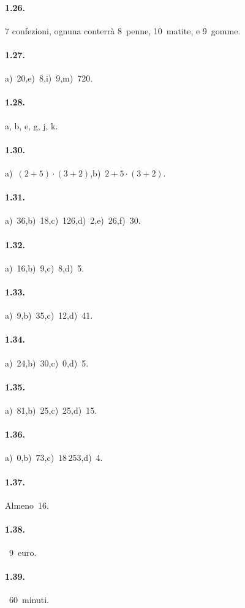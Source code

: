 \paragraph{1.26.}
7 confezioni, ognuna conterrà 8~penne, 10~matite, e 9~gomme.

\paragraph{1.27.}
a)~20,\quad e)~8,\quad i)~9,\quad m)~720.

\paragraph{1.28.}
a, b, e, g, j, k.

\paragraph{1.30.}
a)~$ (2+5)\cdot(3+2) $,\quad b)~$ 2+5\cdot(3+2) $.

\paragraph{1.31.}
a)~36,\quad b)~18,\quad c)~126,\quad d)~2,\quad e)~26,\quad f)~30.

\paragraph{1.32.}
a)~16,\quad b)~9,\quad c)~8,\quad d)~5.

\paragraph{1.33.}
a)~9,\quad b)~35,\quad c)~12,\quad d)~41.

\paragraph{1.34.}
a)~24,\quad b)~30,\quad c)~0,\quad d)~5.

\paragraph{1.35.}
a)~81,\quad b)~25,\quad c)~25,\quad d)~15.

\paragraph{1.36.}
a)~0,\quad b)~73,\quad c)~$18\,253$,\quad d)~4.
\begin{multicols}{3}
\paragraph{1.37.}
Almeno~16.

\paragraph{1.38.}~9~euro.

\paragraph{1.39.}~60~minuti.
\end{multicols}
